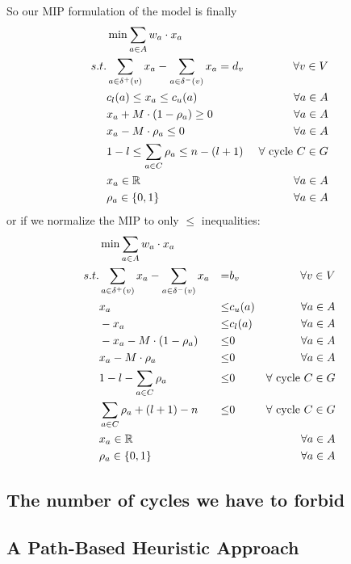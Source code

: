 So our MIP formulation of the model is finally
\begin{align*}
 &\min \sum_{a\in A} w_a\cdot x_a & \\
 s.t. & \sum_{a\in \delta^+(v)}x_a - \sum_{a\in\delta^- (v)}x_a = d_v\ &\forall v\in V \\
  & c_l(a)\le x_a \le c_u(a) & \forall a\in A\\
 &x_a + M\cdot (1-\rho_a) \ge 0 & \forall a\in A\\
 &x_a - M\cdot \rho_a \le 0 & \forall a\in A\\
 &1-l \le \sum_{a\in C}\rho_a \le n-(l+1) & \forall \textrm{ cycle }C\in G\\
 & x_a \in \mathbb{R} &\forall a\in A\\
 & \rho_a \in \{0,1\} &\forall a\in A
\end{align*}
or if we normalize the MIP to only $\le$ inequalities:
\begin{align}
 &\min \sum_{a\in A} w_a\cdot x_a & \\
 s.t. & \sum_{a\in \delta^+(v)}x_a - \sum_{a\in\delta^- (v)}x_a &=& b_v\ &\forall v\in V \\
 & x_a &\le& c_u(a) & \forall a\in A\\
 & -x_a &\le& c_l(a) & \forall a\in A\\
 &-x_a - M\cdot (1-\rho_a) &\le& 0 & \forall a\in A\\
 &x_a - M\cdot \rho_a &\le& 0 & \forall a\in A\\
 &1-l - \sum_{a\in C}\rho_a &\le& 0 & \forall \textrm{ cycle }C\in G\\
 & \sum_{a\in C}\rho_a +(l+1)-n &\le& 0 & \forall \textrm{ cycle }C\in G\\
 & x_a \in \mathbb{R} & & &\forall a\in A\\
 & \rho_a \in \{0,1\} & & &\forall a\in A
\end{align}



\subsection{The number of cycles we have to forbid}

\newpage
\subsection{A Path-Based Heuristic Approach}